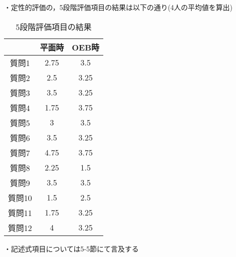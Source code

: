 ・定性的評価の，5段階評価項目の結果は以下の通り(4人の平均値を算出)

\begin{table}[h]
  \begin{center}
  \begin{tabular}{|c|c|c|}
  \hline
       & 平面時  & OEB時 \\ \hline
  質問1  & 2.75 & 3.5  \\ \hline
  質問2  & 2.5  & 3.25 \\ \hline
  質問3  & 3.5  & 3.25 \\ \hline
  質問4  & 1.75 & 3.75 \\ \hline
  質問5  & 3    & 3.5  \\ \hline
  質問6  & 3.5  & 3.25 \\ \hline
  質問7  & 4.75 & 3.75 \\ \hline
  質問8  & 2.25 & 1.5  \\ \hline
  質問9  & 3.5  & 3.5  \\ \hline
  質問10 & 1.5  & 2.5  \\ \hline
  質問11 & 1.75 & 3.25 \\ \hline
  質問12 & 4    & 3.25 \\ \hline
  \end{tabular}
  \caption{5段階評価項目の結果}
\end{center}
  \end{table}

・記述式項目については5-5節にて言及する